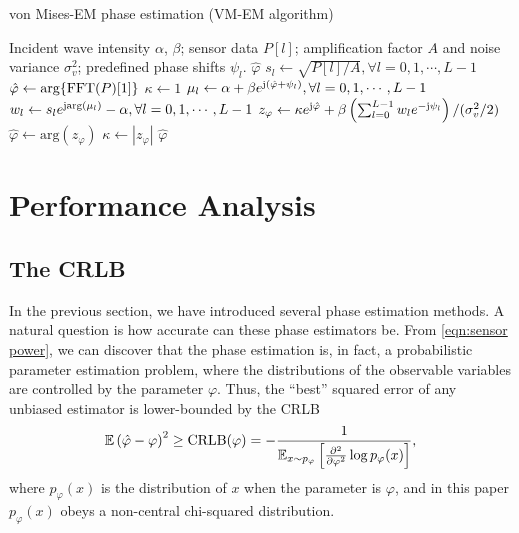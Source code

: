 \documentclass[12pt,draftclsnofoot,journal,onecolumn]{IEEEtran}
\theoremstyle{nonumberplain}
\def \arg {\text{arg}}
\begin{document}
    \begin{algorithm}[htbp] 
        \caption{von Mises-EM phase estimation (VM-EM algorithm)} \label{alg:VM-EM}
        \begin{algorithmic}[1]
            \REQUIRE Incident wave intensity $\alpha$, $\beta$; sensor data $P[l]$; amplification factor $A$ and noise variance $\sigma_v^2$; predefined phase shifts $\psi_l$.
            \ENSURE $\hat{\varphi}$
            \STATE $s_l \leftarrow \sqrt{P[l]/A}, \forall l=0,1,\cdots,L-1$
            \STATE $\hat{\varphi} \leftarrow \arg\{{\rm FFT}(P)[1]\}$
            \STATE $\kappa \leftarrow 1$
                \STATE $\mu_l \leftarrow \alpha + \beta e^{{\rm j} (\hat{\varphi}+\psi_l)}, \forall l=0,1,\cdots,L-1$
                \STATE $w_l \leftarrow s_l e^{{\rm j} \arg(\mu_l)} - \alpha, \forall l=0,1,\cdots,L-1$
                \STATE $z_\varphi \leftarrow \kappa e^{{\rm j} \hat{\varphi}} + \beta \left( \sum_{l=0}^{L-1}{w_l e^{-{\rm j} \psi_l}}\right) / (\sigma_v^2/2)$
                \STATE $\hat{\varphi} \leftarrow \arg(z_\varphi)$
                \STATE $\kappa \leftarrow |z_\varphi|$
            \ENDWHILE
            \RETURN $\hat{\varphi}$
        \end{algorithmic}
    \end{algorithm}
    
\section{Performance Analysis}
\label{Performance Analysis}
\subsection{The CRLB}
    In the previous section, we have introduced several phase estimation methods. A natural question is how accurate can these phase estimators be. From \eqref{eqn:sensor power}, we can discover that the phase estimation is, in fact, a probabilistic parameter estimation problem, where the distributions of the observable variables are controlled by the parameter $\varphi$. Thus, the ``best'' squared error of any unbiased estimator is lower-bounded by the CRLB \cite{casella2021statistical} 
    \begin{equation}
        \mathbb{E}\left(\hat{\varphi}-\varphi\right)^2 \geq {\rm CRLB}(\varphi) = -\frac{1}{\mathbb{E}_{x\sim p_\varphi}\left[\frac{\partial^2}{\partial\varphi^2}\log p_{\varphi}(x)\right]},
        \label{eqn:CRLB definition}
    \end{equation}
    where $p_{\varphi}(x)$ is the distribution of $x$ when the parameter is $\varphi$, and in this paper $p_{\varphi}(x)$ obeys a non-central chi-squared distribution. 
\end{document}
